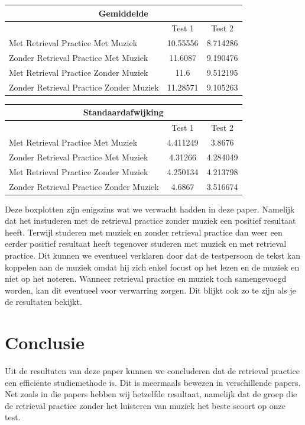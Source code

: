 \documentclass{hogent-article}
\begin{document}
	\begin{tabular}{ |p{10em}|c|c| }
	\hline
		\multicolumn{3}{|c|}{Gemiddelde} \\
	\hline
		& Test 1 & Test 2 \\
	\hline
		Met Retrieval Practice Met Muziek  & 10.55556 & 8.714286 \\
	\hline
		Zonder Retrieval Practice Met Muziek & 11.6087 & 9.190476 \\
	\hline
		Met Retrieval Practice Zonder Muziek & 11.6 & 9.512195 \\
	\hline
		Zonder Retrieval Practice Zonder Muziek & 11.28571 & 9.105263 \\
	\hline
	\end{tabular}

	\begin{tabular}{ |p{10em} |c|c| }
	\hline
		\multicolumn{3}{|c|}{Standaardafwijking} \\
	\hline
		& Test 1 & Test 2 \\
	\hline
		Met Retrieval Practice Met Muziek  & 4.411249 & 3.8676\\
	\hline
		Zonder Retrieval Practice Met Muziek & 4.31266 & 4.284049 \\
	\hline
		Met Retrieval Practice Zonder Muziek & 4.250134  & 4.213798\\
	\hline
		Zonder Retrieval Practice Zonder Muziek & 4.6867 & 3.516674 \\
	\hline
	\end{tabular}
	
	Deze boxplotten zijn enigszins wat we verwacht hadden in deze paper. Namelijk dat het instuderen met de retrieval practice zonder muziek een positief resultaat heeft. Terwijl studeren met muziek en zonder retrieval practice dan weer een eerder positief resultaat heeft tegenover studeren met muziek en met retrieval practice. Dit kunnen we eventueel verklaren door dat de testpersoon de tekst kan koppelen aan de muziek omdat hij zich enkel focust op het lezen en de muziek en niet op het noteren. Wanneer retrieval practice en muziek toch samengevoegd worden, kan dit eventueel voor verwarring zorgen. Dit blijkt ook zo te zijn als je de resultaten bekijkt. 
	
	\section{Conclusie}
	Uit de resultaten van deze paper kunnen we concluderen dat de retrieval practice een efficiënte studiemethode is. Dit is meermaals bewezen in verschillende papers. Net zoals in die papers hebben wij hetzelfde resultaat, namelijk dat de groep die de retrieval practice zonder het luisteren van muziek het beste scoort op onze test.
	
\end{document}
